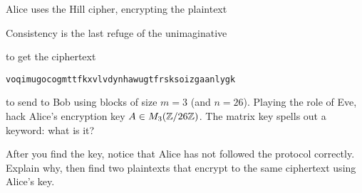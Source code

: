 \begin{problem}
Alice uses the Hill cipher, encrypting the plaintext
\begin{center}
\textsf{Consistency is the last refuge of the unimaginative}
\end{center}
to get the ciphertext
\begin{center}
\texttt{voqimugocogmttfkxvlvdynhawugtfrsksoizgaanlygk}
\end{center}
to send to Bob using blocks of size $m=3$ (and $n=26$).  Playing the
role of Eve, hack Alice's encryption key $A \in M_3(\mathbb{Z}/26\mathbb{Z})$.  The
matrix key spells out a keyword: what is it?

After you find the key,
notice that Alice has not followed the protocol correctly.  Explain
why, then find two plaintexts that encrypt to the same ciphertext
using Alice's key.
\end{problem}

